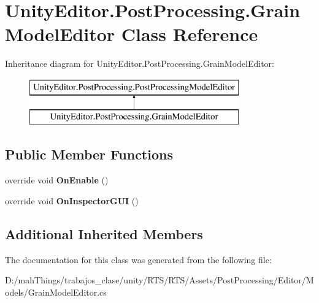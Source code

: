\hypertarget{class_unity_editor_1_1_post_processing_1_1_grain_model_editor}{}\section{Unity\+Editor.\+Post\+Processing.\+Grain\+Model\+Editor Class Reference}
\label{class_unity_editor_1_1_post_processing_1_1_grain_model_editor}
Inheritance diagram for Unity\+Editor.\+Post\+Processing.\+Grain\+Model\+Editor\+:\begin{figure}[H]
\begin{center}
\leavevmode
\includegraphics[height=2.000000cm]{class_unity_editor_1_1_post_processing_1_1_grain_model_editor}
\end{center}
\end{figure}
\subsection*{Public Member Functions}
\begin{DoxyCompactItemize}
\item 
\mbox{\label{class_unity_editor_1_1_post_processing_1_1_grain_model_editor_aecebb5c4de2fcd7df84dfa52ca8f6e4d}} 
override void {\bfseries On\+Enable} ()
\item 
\mbox{\label{class_unity_editor_1_1_post_processing_1_1_grain_model_editor_a89570fe2538ade6f875dac77284e76c4}} 
override void {\bfseries On\+Inspector\+G\+UI} ()
\end{DoxyCompactItemize}
\subsection*{Additional Inherited Members}


The documentation for this class was generated from the following file\+:\begin{DoxyCompactItemize}
\item 
D\+:/mah\+Things/trabajos\+\_\+clase/unity/\+R\+T\+S/\+R\+T\+S/\+Assets/\+Post\+Processing/\+Editor/\+Models/Grain\+Model\+Editor.\+cs\end{DoxyCompactItemize}
